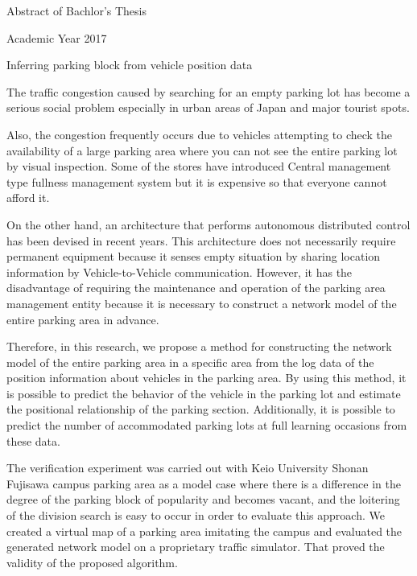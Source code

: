 Abstract of Bachlor's Thesis

\begin{flushright}
	Academic Year 2017
\end{flushright}

\begin{center}
	\begin{large}
		Inferring parking block from vehicle position data 
	\end{large}
\end{center}

The traffic congestion caused by searching for an empty parking lot has become a serious social problem especially in urban areas of Japan and major tourist spots.

Also, the congestion frequently occurs due to vehicles attempting to check the availability of a large parking area where you can not see the entire parking lot by visual inspection.
Some of the stores have introduced Central management type fullness management system but it is expensive so that everyone cannot afford it. 

On the other hand, an architecture that performs autonomous distributed control has been devised in recent years. This architecture does not necessarily require permanent equipment because it senses empty situation by sharing location information by Vehicle-to-Vehicle communication. However, it has the disadvantage of requiring the maintenance and operation of the parking area management entity because it is necessary to construct a network model of the entire parking area in advance.

Therefore, in this research, we propose a method for constructing the network model of the entire parking area in a specific area from the log data of the position information about vehicles in the parking area. By using this method, it is possible to predict the behavior of the vehicle in the parking lot and estimate the positional relationship of the parking section. Additionally, it is possible to predict the number of accommodated parking lots at full learning occasions from these data.

The verification experiment was carried out with Keio University Shonan Fujisawa campus parking area as a model case where there is a difference in the degree of the parking block of popularity and becomes vacant, and the loitering of the division search is easy to occur in order to evaluate this approach. We created a virtual map of a parking area imitating the campus and evaluated the generated network model on a proprietary traffic simulator. That proved the validity of the proposed algorithm.

